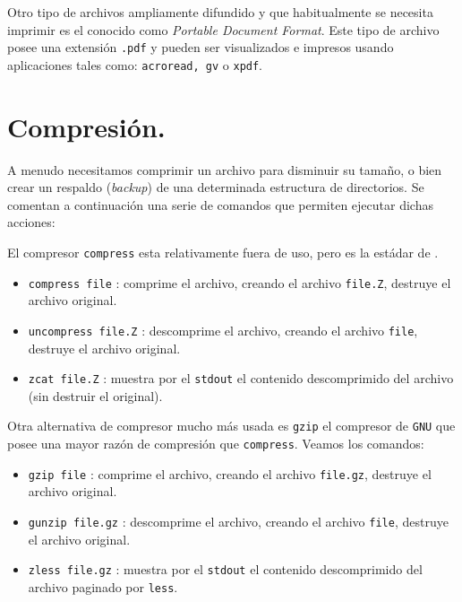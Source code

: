 Otro tipo de archivos ampliamente difundido y que habitualmente se
necesita imprimir es el conocido como {\it Portable Document Format}.
Este tipo de archivo posee una extensi{\'o}n \verb+.pdf+ y pueden ser
visualizados e impresos usando aplicaciones tales como:
\verb+acroread, gv+ o \verb+xpdf+.

\section{Compresi{\'o}n.}

A menudo necesitamos comprimir un archivo para disminuir su tama{\~n}o, o
bien crear un respaldo ({\it backup}) de una determinada estructura de
directorios.  Se comentan a continuaci{\'o}n una serie de comandos que
permiten ejecutar dichas acciones:

El compresor \verb+compress+ esta relativamente fuera de uso, pero es
la est{\'a}dar de {\unix}.

\begin{itemize}
\item \verb+compress file+ : comprime el archivo, creando el archivo
  \verb+file.Z+, destruye el archivo original.
  
\item \verb+uncompress file.Z+ : descomprime el archivo, creando el
  archivo \verb+file+, destruye el archivo original.
  
\item \verb+zcat file.Z+ : muestra por el \verb+stdout+ el contenido
  descomprimido del archivo (sin destruir el original).
\end{itemize}

Otra alternativa de compresor mucho m{\'a}s usada es \verb+gzip+ el
compresor de \verb+GNU+ que posee una mayor raz{\'o}n de compresi{\'o}n
que \verb+compress+. Veamos los comandos:

\begin{itemize}
\item \verb+gzip file+ : comprime el archivo, creando el archivo
  \verb+file.gz+,  destruye el archivo original.
  
\item \verb+gunzip file.gz+ : descomprime el archivo, creando el
  archivo \verb+file+,  destruye el archivo original.
  
\item \verb+zless file.gz+ : muestra por el \verb+stdout+ el contenido
  descomprimido del archivo paginado por \verb+less+.
\end{itemize}

